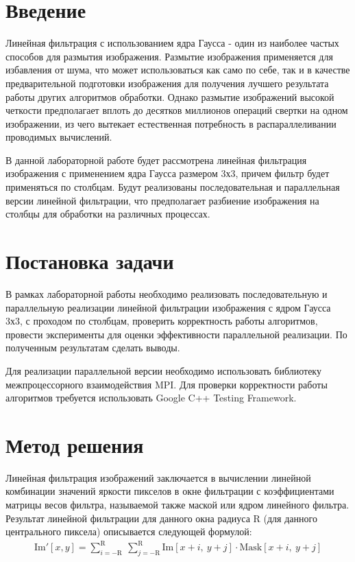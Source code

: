 \documentclass{report}
\begin{document}
\setcounter{page}{2}

\tableofcontents
\newpage

\section*{Введение}
Линейная фильтрация с использованием ядра Гаусса - один из наиболее частых способов для размытия изображения. Размытие изображения применяется для избавления от шума, что может использоваться как само по себе, так и в качестве предварительной подготовки изображения для получения лучшего результата работы других алгоритмов обработки. Однако размытие изображений высокой четкости предполагает вплоть до десятков миллионов операций свертки на одном изображении, из чего вытекает естественная потребность в распараллеливании проводимых вычислений.
\par В данной лабораторной работе будет рассмотрена линейная фильтрация изображения с применением ядра Гаусса размером 3х3, причем фильтр будет применяться по столбцам. Будут реализованы последовательная и параллельная версии линейной фильтрации, что предполагает разбиение изображения на столбцы для обработки на различных процессах.
\newpage

\section*{Постановка задачи}
В рамках лабораторной работы необходимо реализовать последовательную и параллельную реализации линейной фильтрации изображения с ядром Гаусса 3х3, с проходом по столбцам, проверить корректность работы алгоритмов, провести эксперименты для оценки эффективности параллельной реализации. По полученным результатам сделать выводы.
\par Для реализации параллельной версии необходимо использовать библиотеку межпроцессорного взаимодействия MPI. Для проверки корректности работы алгоритмов требуется использовать Google C++ Testing Framework.
\newpage

\section*{Метод решения}
Линейная фильтрация изображений заключается в вычислении линейной комбинации значений яркости пикселов в окне фильтрации с коэффициентами матрицы весов фильтра, называемой также маской или ядром линейного фильтра. Результат линейной фильтрации для данного окна радиуса R (для данного центрального пиксела) описывается следующей формулой:
\begin{gather}
\mbox{Im}'[x,y] = \sum\limits_{i= -\textrm{R}}^{\textrm{R}}~\sum\limits_{j= -\textrm{R}}^{\textrm{R}} {\mbox{Im}[x+i,~y+j]\cdot \mbox{Mask}[x+i,~y+j]}
\end{gather}
\end{document}
